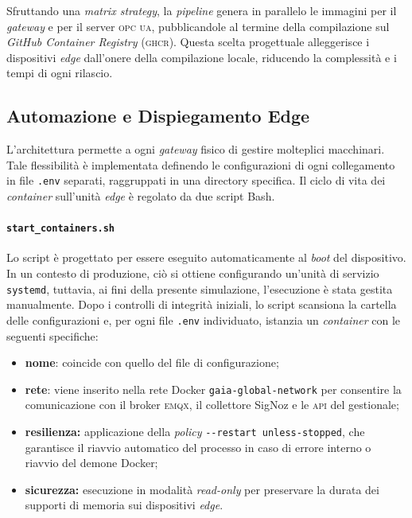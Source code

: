 \documentclass[12pt]{article}
\begin{document}
    Sfruttando una \textit{matrix strategy}, la \textit{pipeline} genera in parallelo le immagini per il \textit{gateway} e per il server \textsc{opc ua}, pubblicandole al termine della compilazione sul \textit{GitHub Container Registry} (\textsc{ghcr}).
    Questa scelta progettuale alleggerisce i dispositivi \textit{edge} dall'onere della compilazione locale, riducendo la complessità e i tempi di ogni rilascio.
    
    \subsection{Automazione e Dispiegamento Edge}
    
    L'architettura permette a ogni \textit{gateway} fisico di gestire molteplici macchinari. Tale flessibilità è implementata definendo le configurazioni di ogni collegamento in file \verb|.env| separati, raggruppati in una directory specifica. Il ciclo di vita dei \textit{container} sull'unità \textit{edge} è regolato da due script Bash.
    
    \paragraph{\texttt{start\_containers.sh}} 
    Lo script è progettato per essere eseguito automaticamente al \textit{boot} del dispositivo. In un contesto di produzione, ciò si ottiene configurando un'unità di servizio \texttt{systemd}, tuttavia, ai fini della presente simulazione, l'esecuzione è stata gestita manualmente. Dopo i controlli di integrità iniziali, lo script scansiona la cartella delle configurazioni e, per ogni file \verb|.env| individuato, istanzia un \textit{container} con le seguenti specifiche:
    \begin{itemize}
        \item \textbf{nome}: coincide con quello del file di configurazione;
        \item \textbf{rete}: viene inserito nella rete Docker \verb|gaia-global-network| per consentire la comunicazione con il broker \textsc{emqx}, il collettore SigNoz e le \textsc{api} del gestionale;
        \item \textbf{resilienza:} applicazione della \textit{policy} \verb|--restart unless-stopped|, che garantisce il riavvio automatico del processo in caso di errore interno o riavvio del demone Docker;
        \item \textbf{sicurezza:} esecuzione in modalità \textit{read-only} per preservare la durata dei supporti di memoria sui dispositivi \textit{edge}.
    \end{itemize}
    
\end{document}
